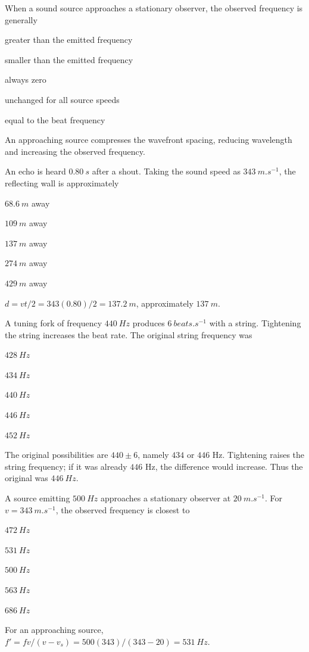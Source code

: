 \documentclass[10pt,a4paper,full]{physicsquiz}
\newcommand{\bankq}[9]{%
  \begin{quizquestion}[
    id=#1,
    topic={#2},
    difficulty=#3,
    marks=1,
    correct=#4,
    tags={#5},
    outcome={#6}
  ]
    #7
    \begin{choiceoptions}
      #8
    \end{choiceoptions}
  \end{quizquestion}
  \begin{quizsolution}
    #9
  \end{quizsolution}
}
\begin{document}
\begin{quizbank}
\bankq{acoustics-083}{Acoustics: Echoes, Beats, and Doppler Effect}{foundation}{A}{acoustics,doppler}{Predict the sign of a Doppler shift.}{%
When a sound source approaches a stationary observer, the observed frequency is generally}{%
\item greater than the emitted frequency
\item smaller than the emitted frequency
\item always zero
\item unchanged for all source speeds
\item equal to the beat frequency}{%
An approaching source compresses the wavefront spacing, reducing wavelength and increasing the observed frequency.}

\bankq{acoustics-084}{Acoustics: Echoes, Beats, and Doppler Effect}{applied}{C}{acoustics,echo,numerical}{Calculate distance from an echo delay.}{%
An echo is heard \(\SI{0.80}{s}\) after a shout. Taking the sound speed as \(\SI{343}{m.s^{-1}}\), the reflecting wall is approximately}{%
\item \(\SI{68.6}{m}\) away
\item \(\SI{109}{m}\) away
\item \(\SI{137}{m}\) away
\item \(\SI{274}{m}\) away
\item \(\SI{429}{m}\) away}{%
\(d=vt/2=343(0.80)/2=\SI{137.2}{m}\), approximately \(\SI{137}{m}\).}

\bankq{acoustics-085}{Acoustics: Echoes, Beats, and Doppler Effect}{applied}{D}{acoustics,beats,tuning}{Infer an unknown tone from beat information.}{%
A tuning fork of frequency \(\SI{440}{Hz}\) produces \(\SI{6}{beats.s^{-1}}\) with a string. Tightening the string increases the beat rate. The original string frequency was}{%
\item \(\SI{428}{Hz}\)
\item \(\SI{434}{Hz}\)
\item \(\SI{440}{Hz}\)
\item \(\SI{446}{Hz}\)
\item \(\SI{452}{Hz}\)}{%
The original possibilities are \(440\pm6\), namely \(434\) or \(446\) Hz. Tightening raises the string frequency; if it was already \(446\) Hz, the difference would increase. Thus the original was \(\SI{446}{Hz}\).}

\bankq{acoustics-086}{Acoustics: Echoes, Beats, and Doppler Effect}{applied}{B}{acoustics,doppler,numerical}{Calculate a Doppler shift for a moving source.}{%
A source emitting \(\SI{500}{Hz}\) approaches a stationary observer at \(\SI{20}{m.s^{-1}}\). For \(v=\SI{343}{m.s^{-1}}\), the observed frequency is closest to}{%
\item \(\SI{472}{Hz}\)
\item \(\SI{531}{Hz}\)
\item \(\SI{500}{Hz}\)
\item \(\SI{563}{Hz}\)
\item \(\SI{686}{Hz}\)}{%
For an approaching source, \(f'=fv/(v-v_s)=500(343)/(343-20)=\SI{531}{Hz}\).}


\end{quizbank}
\end{document}
